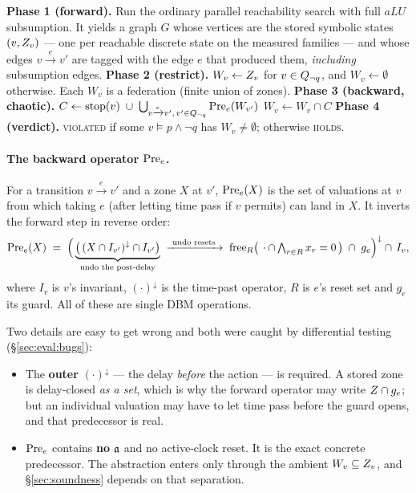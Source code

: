 \begin{algorithm}[h]
\caption{Backward-gfp leads-to. Returns \textsc{holds} or \textsc{violated}.}
\label{alg:gfp}
\begin{algorithmic}[1]
\State \textbf{Phase 1 (forward).} Run the ordinary parallel reachability search with full $aLU$
       subsumption. It yields a graph $G$ whose vertices are the stored symbolic states $(v, Z_v)$
       --- one per reachable discrete state on the measured families --- and whose edges $v
       \xrightarrow{e} v'$ are tagged with the edge $e$ that produced them, \emph{including}
       subsumption edges.
\State \textbf{Phase 2 (restrict).} $W_v \gets Z_v$ for $v \in Q_{\lnot q}$, and
       $W_v \gets \emptyset$ otherwise. Each $W_v$ is a federation (finite union of zones).
\State \textbf{Phase 3 (backward, chaotic).}
\Repeat
     \State $C \gets \mathrm{stop}(v) \;\cup\; \bigcup_{v \xrightarrow{e} v',\, v' \in Q_{\lnot q}} \mathrm{Pre}_e(W_{v'})$
     \State $W_v \gets W_v \cap C$
  \EndFor
{}
\State \textbf{Phase 4 (verdict).} \Return \textsc{violated} if some $v \models p \wedge \lnot q$
       has $W_v \neq \emptyset$; otherwise \textsc{holds}.
\end{algorithmic}
\end{algorithm}

\paragraph{The backward operator $\mathrm{Pre}_e$.} For a transition $v \xrightarrow{e} v'$ and a zone $X$
at $v'$, $\mathrm{Pre}_e(X)$ is the set of valuations at $v$ from which taking $e$ (after letting time pass
if $v$ permits) can land in $X$. It inverts the forward step in reverse order:
\[
  \mathrm{Pre}_e(X) \;=\; \Big( \underbrace{\big(\,(X \cap I_{v'})^{\downarrow} \cap I_{v'}\big)}_{\text{undo the post-delay}}
  \;\xrightarrow{\ \text{undo resets}\ }\;
  \mathrm{free}_R\big(\,\cdot \cap \textstyle\bigwedge_{r \in R} x_r = 0\,\big)
  \;\cap\; g_e \Big)^{\downarrow} \cap\, I_v ,
\]
where $I_v$ is $v$'s invariant, $(\cdot)^{\downarrow}$ is the time-past operator, $R$ is $e$'s reset
set and $g_e$ its guard. All of these are single DBM operations.

Two details are easy to get wrong and both were caught by differential testing
(\S\ref{sec:eval:bugs}):

\begin{itemize}
  \item The \textbf{outer} $(\cdot)^{\downarrow}$ --- the delay \emph{before} the action --- is
        required. A stored zone is delay-closed \emph{as a set}, which is why the forward operator
        may write $Z \cap g_e$; but an individual valuation may have to let time pass before the
        guard opens, and that predecessor is real.
  \item $\mathrm{Pre}_e$ contains \textbf{no} $\mathfrak{a}$ and no active-clock reset. It is the exact concrete
        predecessor. The abstraction enters only through the ambient $W_v \subseteq Z_v$, and
        \S\ref{sec:soundness} depends on that separation.
\end{itemize}

